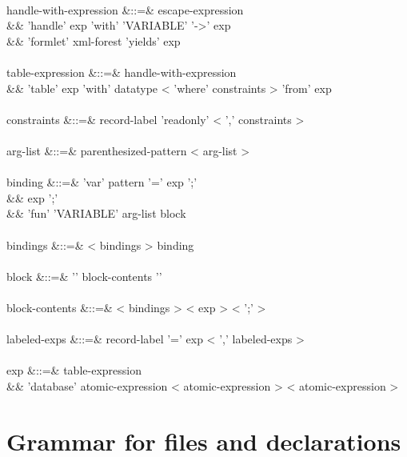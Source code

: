 \documentclass[11pt,a4paper]{article}
\begin{document}
\begin{grammar}
\\
handle-with-expression &::=& escape-expression \\
&&                          'handle' exp 'with' 'VARIABLE' '->' exp \\
&&                          'formlet' xml-forest 'yields' exp \\
\\
table-expression &::=&  handle-with-expression \\
&&                      'table' exp 'with' datatype < 'where' constraints > 'from' exp \\
\\
constraints &::=& record-label 'readonly' < ',' constraints > \\
\\
arg-list &::=& parenthesized-pattern < arg-list >  \\
\\
binding &::=& 'var' pattern '=' exp ';' \\
&&            exp ';' \\
&&            'fun' 'VARIABLE' arg-list block \\
\\
bindings &::=& < bindings > binding \\
\\
block &::=& '{' block-contents '}' \\
\\
block-contents &::=& < bindings > < exp > < ';' >  \\
\\
labeled-exps &::=& record-label '=' exp < ',' labeled-exps > \\
\\
exp &::=& table-expression \\
&&        'database' atomic-expression < atomic-expression > < atomic-expression >  \\
\end{grammar} 

\section{Grammar for files and declarations}
\end{document}
